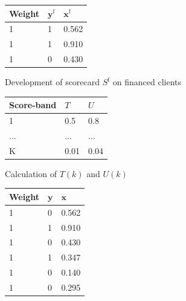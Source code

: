 \begin{table}
\caption{\label{parcel} Example of implementation of the Parcelling method on a small dataset}
{\setlength{\parindent}{0cm}
\begin{multicols}{3}

\begin{subfigure}[t]{0.31\textwidth}
\begin{center}
\begin{adjustbox}{max width=\textwidth}
\begin{tabular}{l l l}
\toprule
\textbf{Weight} & \textbf{${\bm{y}}^{\text{f}}$} & \textbf{${\bm{x}}^{\text{f}}$}\\
\midrule
1 & 1 & 0.562 \\
1 & 1 & 0.910 \\
1 & 0 & 0.430 \\
\bottomrule
\end{tabular}
\end{adjustbox}
\end{center}

\caption{Development of scorecard $S^{\text{f}}$ on financed clients}
\label{parcel:sfig1}
\end{subfigure}

\columnbreak

\begin{subfigure}[t]{0.31\textwidth}
\begin{center}
\begin{adjustbox}{max width=\textwidth}
\begin{tabular}{l l l}
\toprule
\textbf{Score-band} & \textbf{$T$} &  \textbf{$U$} \\
\midrule
1 & 0.5 & 0.8 \\
... & ... & ... \\
K & 0.01 & 0.04 \\
\bottomrule
\end{tabular}
\end{adjustbox}
\end{center}

\caption{Calculation of $T(k)$ and $U(k)$}
\label{parcel:sfig2}
\end{subfigure}

\columnbreak

\begin{subfigure}[t]{0.31\textwidth}
\begin{center}
\begin{adjustbox}{max width=\textwidth}
\begin{tabular}{l l l}
\toprule
\textbf{Weight} & \textbf{${\bm{y}}$} & \textbf{${\bm{x}}$}\\
\midrule
1 & 0 & 0.562 \\
1 & 1 & 0.910 \\
1 & 0 & 0.430 \\
1 & 1 & 0.347 \\
1 & 0 & 0.140 \\
1 & 0 & 0.295 \\
\bottomrule
\end{tabular}
\end{adjustbox}
\end{center}


\end{subfigure}
\end{multicols}}
\end{table}

